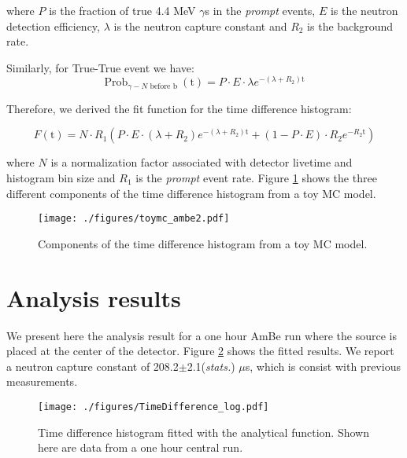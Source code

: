 \documentclass[a4paper]{jpconf}
\begin{document}
where $P$ is the fraction of true 4.4 MeV $\gamma$s in the \textit{prompt} events, $E$ is the neutron detection efficiency, $\lambda$ is the neutron capture constant and $R_2$ is the background rate.

Similarly, for True-True event we have:
\begin{equation}
\textrm{Prob}_{\gamma - N\textrm{ before b }}(\textrm{t}) = P \cdot E \cdot \lambda e^{-(\lambda+R_{2})\textrm{t}}
\end{equation}

Therefore, we derived the fit function for the time difference histogram:

\begin{equation}
F(\textrm{t}) = N \cdot R_{1} (P \cdot E \cdot (\lambda+R_{2}) e^{-(\lambda+R_{2}) \textrm{t}} + (1-P \cdot E) \cdot R_{2} e^{-R_{2} \textrm{t}})
\end{equation}

where $N$ is a normalization factor associated with detector livetime and histogram bin size and $R_{1}$ is the \textit{prompt} event rate. Figure \ref{fig:2} shows the three different components of the time difference histogram from a toy MC model.

\begin{figure}[h]
\begin{center}
\texttt{[image: ./figures/toymc\_ambe2.pdf]}
\end{center}
\caption{\label{fig:2}Components of the time difference histogram from a toy MC model.}
\end{figure}

\section{Analysis results}

We present here the analysis result for a one hour AmBe run where the source is placed at the center of the detector. Figure \ref{fig:3} shows the fitted results. We report a neutron capture constant of 208.2$\pm$2.1(\textit{stats.}) $\mu$s, which is consist with previous measurements\cite{Super-Kamiokande:2015xra}\cite{Cokinos:1977zz}.

\begin{figure}[h]
\begin{center}
\texttt{[image: ./figures/TimeDifference\_log.pdf]}
\end{center}
\caption{\label{fig:3}Time difference histogram fitted with the analytical function. Shown here are data from a one hour central run.}
\end{figure}
\end{document}
